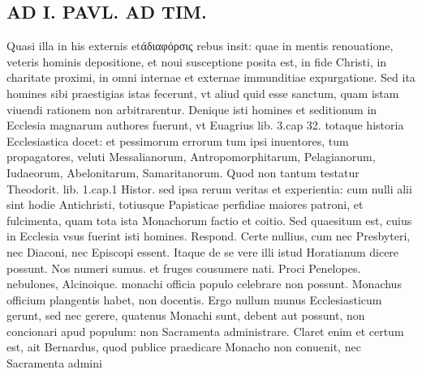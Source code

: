 \documentclass{article}
\begin{document}
\begin{pages}
\section*{AD I. PAVL. AD TIM. }
\marginpar{[ p.222 ]}\pstart Quasi illa in his externis etάδιαφόρσις rebus insit: quae in mentis renouatione, veteris hominis depositione, et noui susceptione posita est, in fide Christi, in charitate proximi, in omni internae et externae immunditiae expurgatione. Sed ita homines sibi praestigias istas fecerunt, vt aliud quid esse sanctum, quam istam viuendi rationem non arbitrarentur. Denique isti homines et seditionum in Ecclesia magnarum authores fuerunt, vt Euagrius lib. 3.cap 32. totaque historia Ecclesiastica docet: et pessimorum errorum tum ipsi inuentores, tum propagatores, veluti Messalianorum, Antropomorphitarum, Pelagianorum, Iudaeorum, Abelonitarum, Samaritanorum. Quod non tantum testatur Theodorit. lib.  1.cap.1 Histor. sed ipsa rerum veritas et experientia: cum nulli alii sint hodie Antichristi, totiusque Papisticae perfidiae maiores patroni, et fulcimenta, quam tota ista Monachorum factio et coitio. Sed quaesitum est, cuius in Ecclesia vsus fuerint isti homines. Respond. Certe nullius, cum nec Presbyteri, nec Diaconi, nec Episcopi essent. Itaque de se vere illi istud Horatianum dicere possunt. Nos numeri sumus. et fruges cousumere nati. Proci Penelopes. nebulones, Alcinoique. monachi officia populo celebrare non possunt. Monachus officium plangentis habet, non docentis. Ergo nullum munus Ecclesiasticum gerunt, sed nec gerere, quatenus Monachi sunt, debent aut possunt, non concionari apud populum: non Sacramenta administrare. Claret enim et certum est, ait Bernardus, quod publice praedicare Monacho non conuenit, nec Sacramenta admini\pend

\end{pages}
\end{document}
